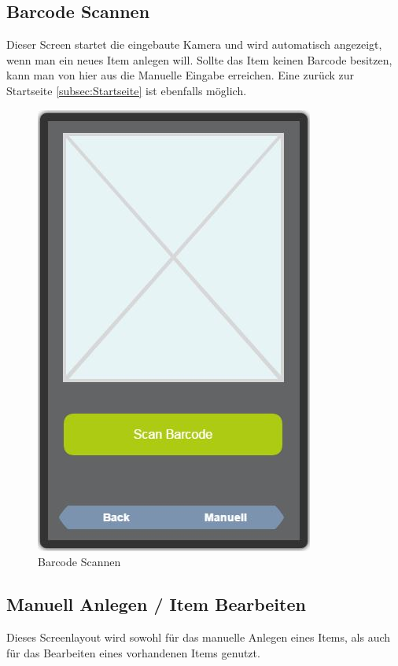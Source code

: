 \subsection{Barcode Scannen}

Dieser Screen startet die eingebaute Kamera und wird automatisch angezeigt, wenn man ein neues Item anlegen will. Sollte das Item keinen Barcode besitzen, kann man von hier aus die Manuelle Eingabe erreichen. Eine zurück zur Startseite \ref{subsec:Startseite} ist ebenfalls möglich.

\begin{figure}[htbp]
	\centering
	\includegraphics[scale=0.5]{pic/GUI/ScanBarcode}
	\caption{Barcode Scannen}
\end{figure}

\subsection{Manuell Anlegen / Item Bearbeiten}

Dieses Screenlayout wird sowohl für das manuelle Anlegen eines Items, als auch für das Bearbeiten eines vorhandenen Items genutzt.\\

